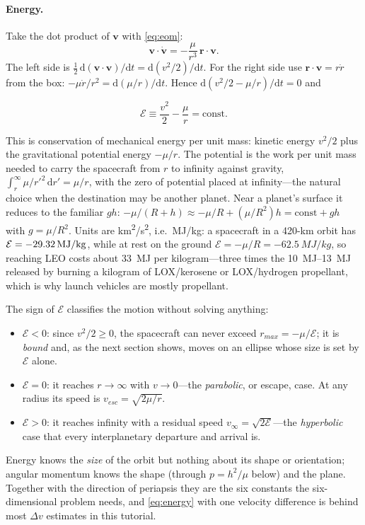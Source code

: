 \documentclass[11pt,letterpaper,oneside]{report}
\newcommand{\dv}{\Delta v}
\newcommand{\vinf}{v_\infty}
\newcommand{\En}{\mathcal E}
\newcommand{\dd}{\mathrm{d}}
\newcommand{\bv}[1]{\bm{#1}}
\begin{document}
\paragraph{Energy.} Take the dot product of $\bv v$ with \cref{eq:eom}:
\[
  \bv v\cdot\dot{\bv v}=-\frac{\mu}{r^3}\,\bv r\cdot\bv v .
\]
The left side is $\tfrac12\,\dd(\bv v\cdot\bv v)/\dd t=\dd(v^2/2)/\dd t$. For the right side use
$\bv r\cdot\bv v=r\dot r$ from the box: $-\mu\dot r/r^2=\dd(\mu/r)/\dd t$. Hence
$\dd(v^2/2-\mu/r)/\dd t=0$ and
\begin{keyresult}
\begin{equation}
  \En \equiv \frac{v^2}{2}-\frac{\mu}{r} = \text{const}.
  \label{eq:energy}
\end{equation}
\end{keyresult}
This is conservation of mechanical energy per unit mass: kinetic energy $v^2/2$ plus the
gravitational potential energy $-\mu/r$. The potential is the work per unit mass needed to carry
the spacecraft from $r$ to infinity against gravity, $\int_r^\infty\mu/r'^2\,\dd r'=\mu/r$, with the
zero of potential placed at infinity---the natural choice when the destination may be another
planet. Near a planet's surface it reduces to the familiar $gh$: $-\mu/(R+h)\approx-\mu/R+(\mu/R^2)h
=\text{const}+gh$ with $g=\mu/R^2$. Units are \si{km^2/s^2}, i.e.\ \si{MJ/kg}: a spacecraft in a
420-km orbit has $\En=\SI{\ISSenergy}{MJ/kg}$, while at rest on the ground
$\En=-\mu/R=\SI{-62.5}{MJ/kg}$, so reaching LEO costs about \SI{33}{MJ} per kilogram---three
times the \SIrange{10}{13}{MJ} released by burning a kilogram of LOX/kerosene or LOX/hydrogen
propellant, which is why launch vehicles are mostly propellant.

The sign of $\En$ classifies the motion without solving anything:
\begin{itemize}[nosep]
\item $\En<0$: since $v^2/2\ge0$, the spacecraft can never exceed $r_{max}=-\mu/\En$; it is
      \emph{bound} and, as the next section shows, moves on an ellipse whose size is set by $\En$ alone.
\item $\En=0$: it reaches $r\to\infty$ with $v\to0$---the \emph{parabolic}, or escape, case. At
      any radius its speed is $v_{esc}=\sqrt{2\mu/r}$.
\item $\En>0$: it reaches infinity with a residual speed $\vinf=\sqrt{2\En}$---the
      \emph{hyperbolic} case that every interplanetary departure and arrival is.
\end{itemize}
Energy knows the \emph{size} of the orbit but nothing about its shape or orientation; angular
momentum knows the shape (through $p=h^2/\mu$ below) and the plane. Together with the direction of
periapsis they are the six constants the six-dimensional problem needs, and \cref{eq:energy} with
one velocity difference is behind most $\dv$ estimates in this tutorial.
\end{document}
